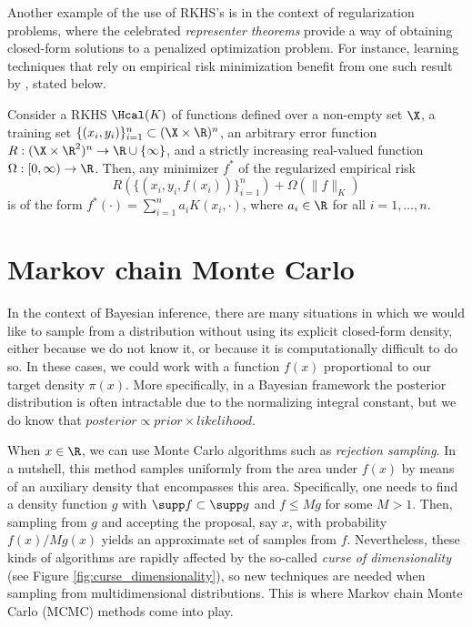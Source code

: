Another example of the use of RKHS's is in the context of regularization problems, where the celebrated \textit{representer theorems} provide a way of obtaining closed-form solutions to a penalized optimization problem. For instance, learning techniques that rely on empirical risk minimization \citep[e.g.][]{vapnik1991principles} benefit from one such result by \citet{scholkopf2001generalized}, stated below.

\begin{theorem}
  Consider a RKHS \(\Hcal(K)\) of functions defined over a non-empty set \(\X\), a training set \(\{(x_i, y_i)\}_{i=1}^n \subset (\X \times \R)^n\), an arbitrary error function \(R: (\X  \times \R^2)^n \to \R\cup\{\infty\}\), and a strictly increasing real-valued function \(\Omega:[0,\infty)\to \R\). Then, any minimizer \(f^\ast\) of the regularized empirical risk
  \[
    R(\{(x_i, y_i, f(x_i))\}_{i=1}^n) + \Omega(\|f\|_K)
  \]
  is of the form \(f^\ast(\cdot) = \sum_{i=1}^n a_i K(x_i, \cdot)\), where \(a_i\in\R\) for all \(i=1,\dots,n\).
\end{theorem}

\section{Markov chain Monte Carlo}\label{sec:mcmc}

In the context of Bayesian inference, there are many situations in which we would like to sample from a distribution without using its explicit closed-form density, either because we do not know it, or because it is computationally difficult to do so. In these cases, we could work with a function \(f(x)\) proportional to our target density \(\pi(x)\). More specifically, in a Bayesian framework the posterior distribution is often intractable due to the normalizing integral constant, but we do know that \(posterior \propto prior \times likelihood\).

When \(x\in\R\), we can use Monte Carlo algorithms such as \textit{rejection sampling}. In a nutshell, this method samples uniformly from the area under \(f(x)\) by means of an auxiliary density that encompasses this area. Specifically, one needs to find a density function \(g\) with \(\supp f \subset \supp g\) and \(f \leq Mg\) for some \(M>1\). Then, sampling from \(g\) and accepting the proposal, say \(x\), with probability \(f(x)/Mg(x)\) yields an approximate set of samples from \(f\). Nevertheless, these kinds of algorithms are rapidly affected by the so-called \textit{curse of dimensionality} (see Figure \ref{fig:curse_dimensionality}), so new techniques are needed when sampling from multidimensional distributions. This is where Markov chain Monte Carlo (MCMC) methods come into play.

